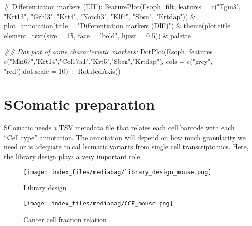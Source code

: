 \documentclass[
  letterpaper,
  DIV=11,
  numbers=noendperiod]{scrreprt}
\newenvironment{Shaded}{\begin{snugshade}}{\end{snugshade}}
\newcommand{\AttributeTok}[1]{\textcolor[rgb]{0.40,0.45,0.13}{#1}}
\newcommand{\CommentTok}[1]{\textcolor[rgb]{0.37,0.37,0.37}{#1}}
\newcommand{\DecValTok}[1]{\textcolor[rgb]{0.68,0.00,0.00}{#1}}
\newcommand{\DocumentationTok}[1]{\textcolor[rgb]{0.37,0.37,0.37}{\textit{#1}}}
\newcommand{\FloatTok}[1]{\textcolor[rgb]{0.68,0.00,0.00}{#1}}
\newcommand{\FunctionTok}[1]{\textcolor[rgb]{0.28,0.35,0.67}{#1}}
\newcommand{\NormalTok}[1]{\textcolor[rgb]{0.00,0.23,0.31}{#1}}
\newcommand{\SpecialCharTok}[1]{\textcolor[rgb]{0.37,0.37,0.37}{#1}}
\newcommand{\StringTok}[1]{\textcolor[rgb]{0.13,0.47,0.30}{#1}}
\begin{document}
\begin{Shaded}
\begin{Highlighting}[]
\CommentTok{\# Differentiation markers (DIF):}
\FunctionTok{FeaturePlot}\NormalTok{(Esoph\_filt, }\AttributeTok{features =} \FunctionTok{c}\NormalTok{(}\StringTok{"Tgm3"}\NormalTok{, }\StringTok{"Krt13"}\NormalTok{, }\StringTok{"Grhl3"}\NormalTok{, }\StringTok{"Krt4"}\NormalTok{, }\StringTok{"Notch3"}\NormalTok{, }\StringTok{"Klf4"}\NormalTok{, }\StringTok{"Sbsn"}\NormalTok{, }\StringTok{"Krtdap"}\NormalTok{)) }\SpecialCharTok{\&} \FunctionTok{plot\_annotation}\NormalTok{(}\AttributeTok{title =} \StringTok{"Differentiation markers (DIF)"}\NormalTok{) }\SpecialCharTok{\&} \FunctionTok{theme}\NormalTok{(}\AttributeTok{plot.title =} \FunctionTok{element\_text}\NormalTok{(}\AttributeTok{size =} \DecValTok{15}\NormalTok{, }\AttributeTok{face =} \StringTok{"bold"}\NormalTok{, }\AttributeTok{hjust =} \FloatTok{0.5}\NormalTok{)) }\SpecialCharTok{\&}\NormalTok{ palette}
\end{Highlighting}
\end{Shaded}

\begin{Shaded}
\begin{Highlighting}[]
\DocumentationTok{\#\# Dot plot of some characteristic markers:}
\FunctionTok{DotPlot}\NormalTok{(Esoph, }\AttributeTok{features =} \FunctionTok{c}\NormalTok{(}\StringTok{"Mki67"}\NormalTok{,}\StringTok{"Krt14"}\NormalTok{,}\StringTok{"Col17a1"}\NormalTok{,}\StringTok{"Krt5"}\NormalTok{,}\StringTok{"Sbsn"}\NormalTok{,}\StringTok{"Krtdap"}\NormalTok{), }\AttributeTok{cols =} \FunctionTok{c}\NormalTok{(}\StringTok{"grey"}\NormalTok{, }\StringTok{"red"}\NormalTok{),}\AttributeTok{dot.scale =} \DecValTok{10}\NormalTok{) }\SpecialCharTok{+} \FunctionTok{RotatedAxis}\NormalTok{()}
\end{Highlighting}
\end{Shaded}

\section{SComatic preparation}\label{scomatic-preparation}

SComatic needs a TSV metadata file that relates each cell barcode with
each ``Cell type'' annotation. The annotation will depend on how much
granularity we need or is adequate to cal lsomatic variants from single
cell transcriptomics. Here, the library design plays a very important
role.

\begin{figure}[H]

{\centering \texttt{[image: index\_files/mediabag/library\_design\_mouse.png]}

}

\caption{Library design}

\end{figure}%
\begin{figure}[H]

{\centering \texttt{[image: index\_files/mediabag/CCF\_mouse.png]}

}

\caption{Cancer cell fraction relation}

\end{figure}%
\end{document}
